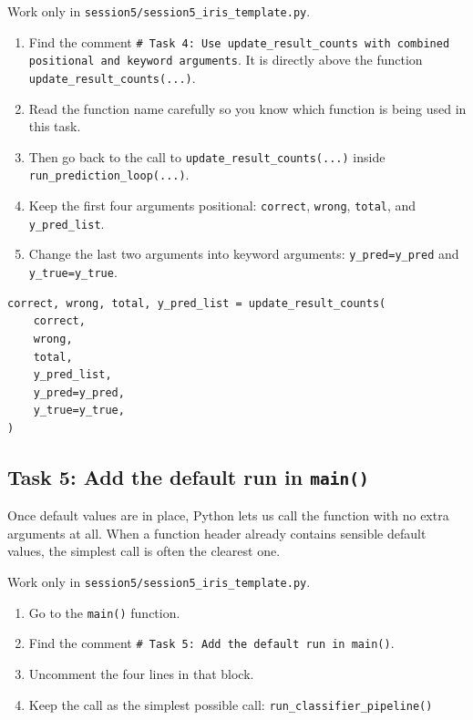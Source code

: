 \begin{tcolorbox}[title=Task 4: Use \texttt{update\_result\_counts} with combined positional and keyword arguments]
Work only in \texttt{session5/session5\_iris\_template.py}.

\begin{enumerate}
    \item Find the comment \texttt{\# Task 4: Use update\_result\_counts with combined positional and keyword arguments}. It is directly above the function \texttt{update\_result\_counts(...)}.
    \item Read the function name carefully so you know which function is being used in this task.
    \item Then go back to the call to \texttt{update\_result\_counts(...)} inside \texttt{run\_prediction\_loop(...)}.
    \item Keep the first four arguments positional:
    \texttt{correct}, \texttt{wrong}, \texttt{total}, and \texttt{y\_pred\_list}.
    \item Change the last two arguments into keyword arguments:
    \texttt{y\_pred=y\_pred} and \texttt{y\_true=y\_true}.
\end{enumerate}
\end{tcolorbox}

\begin{verbatim}
correct, wrong, total, y_pred_list = update_result_counts(
    correct,
    wrong,
    total,
    y_pred_list,
    y_pred=y_pred,
    y_true=y_true,
)
\end{verbatim}

\subsection{Task 5: Add the default run in \texttt{main()}}
Once default values are in place, Python lets us call the function with no extra arguments at all. When a function header already contains sensible default values, the simplest call is often the clearest one.
\begin{tcolorbox}[title=Task 5: Add the default run in \texttt{main()}]
Work only in \texttt{session5/session5\_iris\_template.py}.

\begin{enumerate}
    \item Go to the \texttt{main()} function.
    \item Find the comment \texttt{\# Task 5: Add the default run in main()}.
    \item Uncomment the four lines in that block.
    \item Keep the call as the simplest possible call:
    \texttt{run\_classifier\_pipeline()}
\end{enumerate}
\end{tcolorbox}

